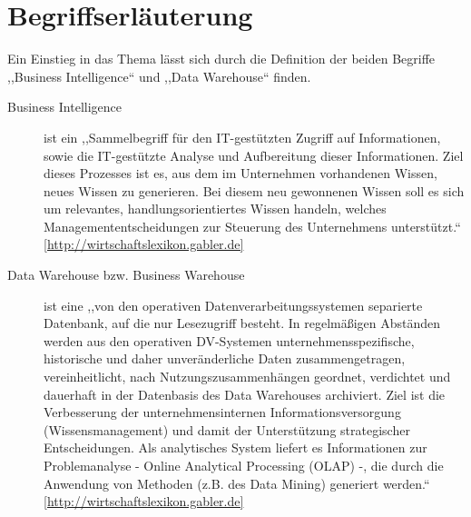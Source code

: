 \section{Begriffserläuterung}
Ein Einstieg in das Thema lässt sich durch die Definition der beiden Begriffe ,,Business Intelligence`` und ,,Data Warehouse`` finden. 

\begin{description}
	\item[Business Intelligence] ist ein ,,Sammelbegriff für den IT-gestützten Zugriff auf Informationen, sowie die IT-gestützte Analyse und Aufbereitung dieser Informationen. Ziel dieses Prozesses ist es, aus dem im Unternehmen vorhandenen Wissen, neues Wissen zu generieren. Bei diesem neu gewonnenen Wissen soll es sich um relevantes, handlungsorientiertes Wissen handeln, welches Managemententscheidungen zur Steuerung des Unternehmens unterstützt.`` \\ \href{http://wirtschaftslexikon.gabler.de/Definition/business-intelligence.html}{[http://wirtschaftslexikon.gabler.de]}
	\item [Data Warehouse bzw. Business Warehouse] ist eine ,,von den operativen Datenverarbeitungssystemen separierte Datenbank, auf die nur Lesezugriff besteht. In regelmäßigen Abständen werden aus den operativen DV-Systemen unternehmensspezifische, historische und daher unveränderliche Daten zusammengetragen, vereinheitlicht, nach Nutzungszusammenhängen geordnet, verdichtet und dauerhaft in der Datenbasis des Data Warehouses archiviert. Ziel ist die Verbesserung der unternehmensinternen Informationsversorgung (Wissensmanagement) und damit der Unterstützung strategischer Entscheidungen. Als analytisches System liefert es Informationen zur Problemanalyse - Online Analytical Processing (OLAP) -, die durch die Anwendung von Methoden (z.B. des Data Mining) generiert werden.`` \\ 
	 		\href{http://wirtschaftslexikon.gabler.de/Definition/data-warehouse.html?referenceKeywordName=Business+Warehouse}{[http://wirtschaftslexikon.gabler.de]}
\end{description}

